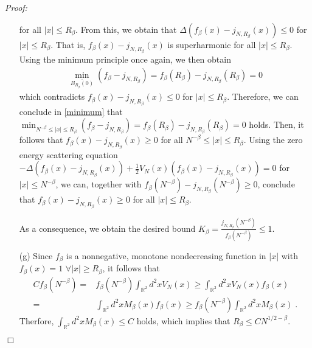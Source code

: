 \documentclass[11pt, english, american]{article}
\newenvironment{proof}{\emph{Proof:}}{\begin{flushright} $ \Box $ \end{flushright}}
\begin{document}
\begin{proof}
\begin{enumerate}
for all $|x| \leq R_\beta$. From this, we obtain that
 $\Delta 
(
f_\beta(x)-j_{N,R_\beta}(x)
) \leq 0$ for $ |x|\leq R_\beta$. That is, $f_\beta(x)-j_{N,R_\beta}(x)$ is superharmonic for all
$ |x|\leq R_\beta$.
Using the minimum principle once again, we then obtain
\begin{align*}
\min_{\overline{B_{R_\beta}(0)}} ( f_\beta-j_{N,R_\beta})
=
 f_\beta(R_\beta)-j_{N,R_\beta}(R_\beta)=0
\end{align*}
which contradicts $ f_{\beta}(x)- j_{N,R_\beta}(x) \leq 0$ for $|x| \leq R_\beta$.
Therefore, we can conclude in \eqref{minimum} that
$
\min_{N^{-\beta} \leq |x|\leq R_\beta} ( f_\beta-j_{N,R_\beta})
=
  f_\beta(R_\beta)-j_{N,R_\beta}(R_\beta)=0
$ holds. Then, it follows that $f_\beta(x)-j_{N,R_\beta}(x) \geq 0$ for all $N^{-\beta} \leq |x| \leq R_\beta$. Using the zero energy scattering equation
$-\Delta 
(
f_\beta(x)-j_{N,R_\beta}(x)
)
+
\frac{1}{2}
V_N(x)
(
f_\beta(x)-j_{N,R_\beta}(x)
)
=
0$ for $|x| \leq N^{-\beta}$, we can, together with $  f_\beta(N^{-\beta})-j_{N,R_\beta}(N^{-\beta}) \geq 0$, conclude that  $ f_{\beta}(x)- j_{N,R_\beta}(x) \geq 0$ for all $|x| \leq R_\beta$. 

As a consequence, we obtain the desired bound
$
K_\beta=
\frac{j_{N,R_\beta}(N^{-\beta})}{f_\beta(N^{-\beta})}\leq 1$.


\item[(g)]
Since $f_\beta$ is a nonnegative, monotone nondecreasing function in $|x|$ with $f_\beta (x)=1$ $\forall |x| \geq R_\beta$, it follows that
\begin{align*}
C f_\beta(N^{-\beta}) 
=&
f_\beta(N^{-\beta}) 
\int_{\mathbb{R}^2} d^2 x V_N(x) 
\geq
\int_{\mathbb{R}^2} d^2 x V_N(x) f_\beta(x) 
\\
=&
\int_{\mathbb{R}^2} d^2 x M_\beta(x) f_\beta(x) 
\geq
f_{\beta} (N^{-\beta})
\int_{\mathbb{R}^2} d^2 x M_\beta (x)
\;.
\end{align*}
Therfore, $\int_{\mathbb{R}^2} d^2 x M_\beta (x) \leq C$ holds, which implies that $R_\beta \leq C N^{1/2- \beta}$.




\end{enumerate}
\end{proof}
\end{document}
